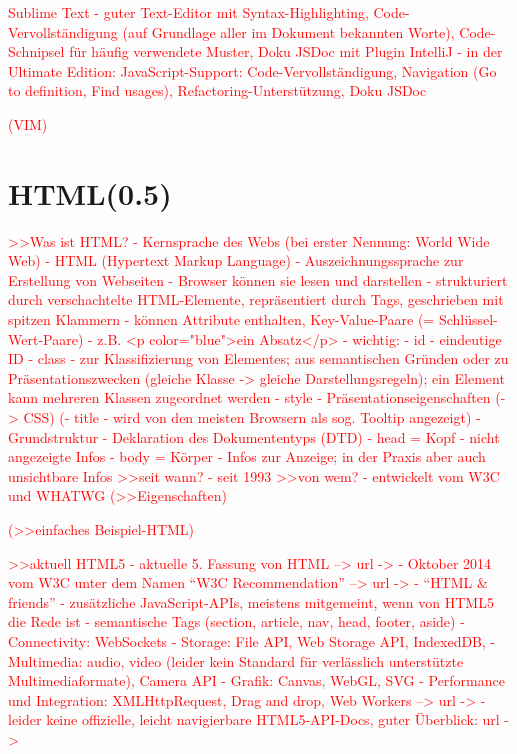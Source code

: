 \documentclass[a4paper, 12pt, hidelinks, listof=totoc, listoftables=totoc, bibliography=totoc]{scrreprt}
\newcommand{\TODO}[1]{\textcolor{red}{#1}\newline}
\begin{document}
\TODO{Sublime Text - guter Text-Editor mit Syntax-Highlighting, Code-Vervollständigung (auf Grundlage aller im Dokument bekannten Worte), Code-Schnipsel für häufig verwendete Muster, Doku JSDoc mit Plugin}
\TODO{IntelliJ - in der Ultimate Edition: JavaScript-Support: Code-Vervollständigung, Navigation (Go to definition, Find usages), Refactoring-Unterstützung, Doku JSDoc}

\TODO{(VIM)}


\section{HTML(0.5)}


\TODO{>>Was ist HTML?
	- Kernsprache des Webs (bei erster Nennung: World Wide Web)
	- HTML (Hypertext Markup Language)
	- Auszeichnungssprache zur Erstellung von Webseiten
	- Browser können sie lesen und darstellen
	- strukturiert durch verschachtelte HTML-Elemente, repräsentiert durch Tags, geschrieben mit spitzen Klammern
		- können Attribute enthalten, Key-Value-Paare (= Schlüssel-Wert-Paare)
		- z.B. <p color="blue">ein Absatz</p>
		- wichtig:
			- id - eindeutige ID
			- class - zur Klassifizierung von Elementes; aus semantischen Gründen oder zu Präsentationszwecken (gleiche Klasse -> gleiche Darstellungsregeln); ein Element kann mehreren Klassen zugeordnet werden
			- style - Präsentationseigenschaften (-> CSS)
			(- title - wird von den meisten Browsern als sog. Tooltip angezeigt)
	- Grundstruktur
		- Deklaration des Dokumententyps (DTD)
		- head = Kopf - nicht angezeigte Infos
		- body = Körper - Infos zur Anzeige; in der Praxis aber auch unsichtbare Infos
}
\TODO{>>seit wann?
	- seit 1993}
\TODO{>>von wem?
	- entwickelt vom W3C und WHATWG}
\TODO{(>>Eigenschaften)}

\TODO{(>>einfaches Beispiel-HTML)}

\TODO{>>aktuell HTML5}
\TODO{	- aktuelle 5. Fassung von HTML  -->  url -> %
	}
\TODO{	- Oktober 2014 vom W3C unter dem Namen "`W3C Recommendation"'  -->  url -> %
}
\TODO{	- "`HTML \& friends"' - zusätzliche JavaScript-APIs, meistens mitgemeint, wenn von HTML5 die Rede ist
		- semantische Tags (section, article, nav, head, footer, aside)
		- Connectivity: WebSockets
		- Storage: File API, Web Storage API, IndexedDB, 
		- Multimedia: audio, video (leider kein Standard für verlässlich unterstützte Multimediaformate), Camera API
		- Grafik: Canvas, WebGL, SVG
		- Performance und Integration: XMLHttpRequest, Drag and drop, Web Workers}
\TODO{	-->  url -> %
}
\TODO{	- leider keine offizielle, leicht navigierbare HTML5-API-Docs, guter Überblick: url -> %
}
\end{document}

